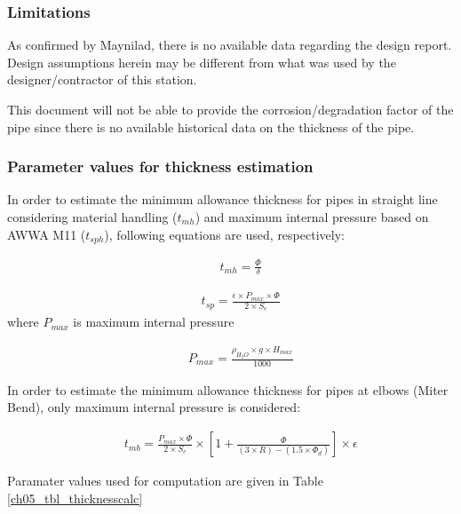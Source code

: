 \subsubsection{Limitations}
As confirmed by Maynilad, there is no available data regarding the design report. Design assumptions herein may be different from what was used by the designer/contractor of this station.

This document will not be able to provide the corrosion/degradation factor of the pipe since there is no available historical data on the thickness of the pipe.

\subsubsection{Parameter values for thickness estimation}
In order to estimate the minimum allowance thickness for pipes in straight line considering material handling ($t_{mh}$) and maximum internal pressure based on AWWA M11 ($t_{sph}$), following equations are used, respectively:

\begin{eqnarray}
&& t_{mh} = \frac{\Phi}{\delta} \label{ch05thickness01}
\end{eqnarray}

\begin{eqnarray}
&& t_{sp} = \frac{\epsilon\times P_{max} \times \Phi}{2 \times S_e} \label{ch05thickness02}
\end{eqnarray}
where $P_{max}$ is maximum internal pressure

\begin{eqnarray}
&& P_{max} = \frac{\rho_{H_2O} \times g \times H_{max}}{1000} \label{ch05thickness03}
\end{eqnarray}

In order to estimate the minimum allowance thickness for pipes at elbows (Miter Bend), only maximum internal pressure is considered:

\begin{eqnarray}
&& t_{mb} = \frac{P_{max} \times \Phi}{2 \times S_e} \times \left[ 1 + \frac{\Phi}{(3 \times R)-(1.5 \times \Phi_d)}\right]\times \epsilon \label{ch05thickness04}
\end{eqnarray}

Paramater values used for computation are given in Table \ref{ch05_tbl_thicknesscalc}


